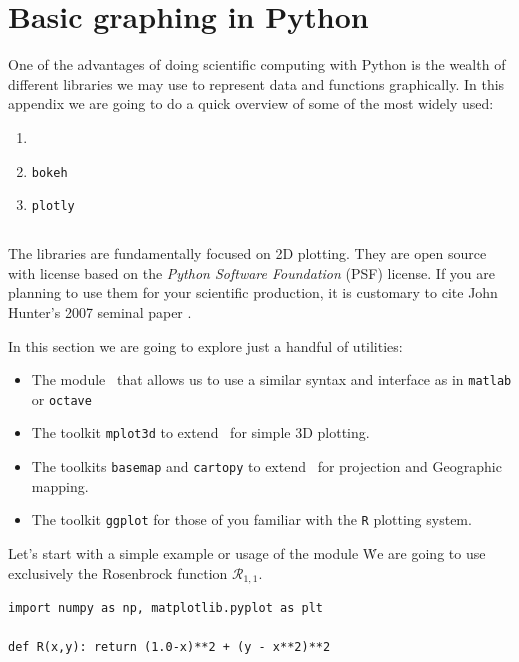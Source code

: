 
\chapter{Basic graphing in Python}\label{appendix:matplotlib}

One of the advantages of doing scientific computing with Python is the wealth of different libraries we may use to represent data and functions graphically.  In this appendix we are going to do a quick overview of some of the most widely used:

\begin{enumerate}
	\item \matplotlib
	\item \texttt{bokeh}
	\item \texttt{plotly}
\end{enumerate}

\section{\matplotlib}

The \matplotlib libraries are fundamentally focused on 2D plotting.  They are open source with license based on the \emph{Python Software Foundation} (PSF) license.  If you are planning to use them for your scientific production, it is customary to cite John Hunter's 2007 seminal paper \cite{Hunter:2007}.   

In this section we are going to explore just a handful of utilities:
\begin{itemize}
 	\item The module \pyplot\, that allows us to use a similar syntax and interface as in \texttt{matlab} or \texttt{octave}
 	\item The toolkit \texttt{mplot3d} to extend \matplotlib\ for simple 3D plotting.
 	\item The toolkits \texttt{basemap} and \texttt{cartopy} to extend \matplotlib\ for projection and Geographic mapping.
 	\item The toolkit \texttt{ggplot} for those of you familiar with the \texttt{R} plotting system.
 \end{itemize} 

Let's start with a simple example or usage of the module \pyplot\.  We are going to use exclusively the Rosenbrock function $\mathcal{R}_{1,1}$.

\begin{verbatim}
import numpy as np, matplotlib.pyplot as plt 

def R(x,y): return (1.0-x)**2 + (y - x**2)**2
\end{verbatim}

